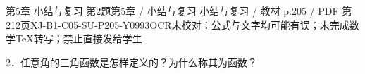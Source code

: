 \begin{bankitem}{第5章 小结与复习 第2题}{第5章 / 小结与复习 小结与复习 / 教材 p.205 / PDF 第212页}{XJ-B1-C05-SU-P205-Y0993}{OCR未校对：公式与文字均可能有误；未完成数学TeX转写；禁止直接发给学生}
\begin{ocrdraft}
\par
2．任意角的三角函数是怎样定义的？为什么称其为函数？
\end{ocrdraft}
\end{bankitem}
